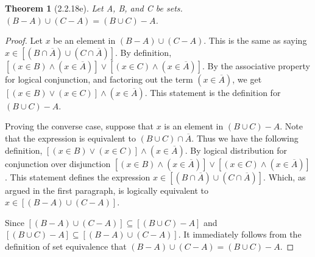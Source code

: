 \documentclass[a4paper, 12pt]{article}
\theoremstyle{plain}
\newtheorem*{theorem*}{Theorem}
\begin{document}
	
	\begin{theorem*}[2.2.18e]
		Let A, B, and C be sets. $(B - A) \cup (C - A) = (B \cup C) - A$.
	\end{theorem*}
	
	\begin{proof}
		Let $x$ be an element in $(B - A) \cup (C - A)$. This is the same as saying $x \in [(B \cap \overline{A}) \cup (C \cap \overline{A})]$. By definition, \newline $[(x \in B) \land (x \in \overline{A})] \lor [(x \in C) \land (x \in \overline{A})]$. By the associative property for logical conjunction, and factoring out the term $(x \in \overline{A})$, we get \newline $[(x \in B) \lor (x \in C)] \land (x \in \overline{A})$. This statement is the definition for \newline $(B \cup C) - A$.
		
		Proving the converse case, suppose that $x$ is an element in $(B \cup C) - A$. Note that the expression is equivalent to $(B \cup C) \cap \overline{A}$. Thus we have the following definition, $[(x \in B) \lor (x \in C)] \land (x \in \overline{A})$. By logical distribution for conjunction over disjunction $[(x \in B) \land (x \in \overline{A})] \lor [(x \in C) \land (x \in \overline{A})]$. This statement defines the expression $x \in [(B \cap \overline{A}) \cup (C \cap \overline{A})]$. Which, as argued in the first paragraph, is logically equivalent to $x \in [(B - A) \cup (C - A)]$.
		
		Since $[(B - A) \cup (C - A)] \subseteq [(B \cup C) - A]$ and \newline $[(B \cup C) - A] \subseteq [(B - A) \cup (C - A)]$. It immediately follows from the definition of set equivalence that $(B - A) \cup (C - A) = (B \cup C) - A$.
	\end{proof}
\end{document}
